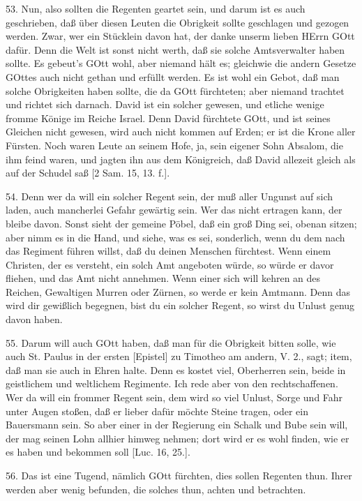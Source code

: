 53. Nun, also sollten die Regenten geartet sein, und darum ist es auch geschrieben, daß über diesen Leuten die Obrigkeit sollte geschlagen und gezogen werden. Zwar, wer ein Stücklein davon hat, der danke unserm lieben HErrn GOtt dafür. Denn die Welt ist sonst nicht werth, daß sie solche Amtsverwalter haben sollte. Es gebeut's GOtt wohl, aber niemand hält es; gleichwie die andern Gesetze GOttes auch nicht gethan und erfüllt werden. Es ist wohl ein Gebot, daß man solche Obrigkeiten haben sollte, die da GOtt fürchteten; aber niemand trachtet und richtet sich darnach. David ist ein solcher gewesen, und etliche wenige fromme Könige im Reiche Israel. Denn David fürchtete GOtt, und ist seines Gleichen nicht gewesen, wird auch nicht kommen auf Erden; er ist die Krone aller Fürsten. Noch waren Leute an seinem Hofe, ja, sein eigener Sohn Absalom, die ihm feind waren, und jagten ihn aus dem Königreich, daß David allezeit gleich als auf der Schudel saß [2 Sam. 15, 13. f.].

54. Denn wer da will ein solcher Regent sein, der muß aller Ungunst auf sich laden, auch mancherlei Gefahr gewärtig sein. Wer das nicht ertragen kann, der bleibe davon. Sonst sieht der gemeine Pöbel, daß ein groß Ding sei, obenan sitzen; aber nimm es in die Hand, und siehe, was es sei, sonderlich, wenn du dem nach das Regiment führen willst, daß du deinen Menschen fürchtest. Wenn einem Christen, der es versteht, ein solch Amt angeboten würde, so würde er davor fliehen, und das Amt nicht annehmen. Wenn einer sich will kehren an des Reichen, Gewaltigen Murren oder Zürnen, so werde er kein Amtmann. Denn das wird dir gewißlich begegnen, bist du ein solcher Regent, so wirst du Unlust genug davon haben.

55. Darum will auch GOtt haben, daß man für die Obrigkeit bitten solle, wie auch St. Paulus in der ersten [Epistel] zu Timotheo am andern, V. 2., sagt; item, daß man sie auch in Ehren halte. Denn es kostet viel, Oberherren sein, beide in geistlichem und weltlichem Regimente. Ich rede aber von den rechtschaffenen. Wer da will ein frommer Regent sein, dem wird so viel Unlust, Sorge und Fahr unter Augen stoßen, daß er lieber dafür möchte Steine tragen, oder ein Bauersmann sein. So aber einer in der Regierung ein Schalk und Bube sein will, der mag seinen Lohn allhier himweg nehmen; dort wird er es wohl finden, wie er es haben und bekommen soll [Luc. 16, 25.].

56. Das ist eine Tugend, nämlich GOtt fürchten, dies sollen Regenten thun. Ihrer werden aber wenig befunden, die solches thun, achten und betrachten.

